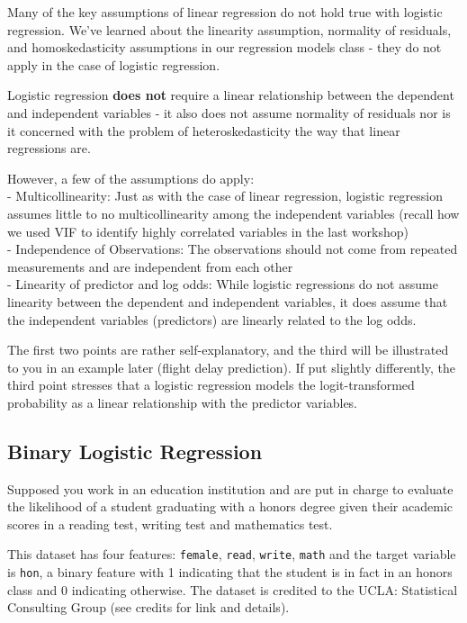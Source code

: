 \documentclass[
]{article}
\begin{document}
Many of the key assumptions of linear regression do not hold true with
logistic regression. We've learned about the linearity assumption,
normality of residuals, and homoskedasticity assumptions in our
regression models class - they do not apply in the case of logistic
regression.

Logistic regression \textbf{does not} require a linear relationship
between the dependent and independent variables - it also does not
assume normality of residuals nor is it concerned with the problem of
heteroskedasticity the way that linear regressions are.

However, a few of the assumptions do apply:\\
- Multicollinearity: Just as with the case of linear regression,
logistic regression assumes little to no multicollinearity among the
independent variables (recall how we used VIF to identify highly
correlated variables in the last workshop)\\
- Independence of Observations: The observations should not come from
repeated measurements and are independent from each other\\
- Linearity of predictor and log odds: While logistic regressions do not
assume linearity between the dependent and independent variables, it
does assume that the independent variables (predictors) are linearly
related to the log odds.

The first two points are rather self-explanatory, and the third will be
illustrated to you in an example later (flight delay prediction). If put
slightly differently, the third point stresses that a logistic
regression models the logit-transformed probability as a linear
relationship with the predictor variables.

\hypertarget{binary-logistic-regression}{%
\subsection{Binary Logistic
Regression}\label{binary-logistic-regression}}

Supposed you work in an education institution and are put in charge to
evaluate the likelihood of a student graduating with a honors degree
given their academic scores in a reading test, writing test and
mathematics test.

This dataset has four features: \texttt{female}, \texttt{read},
\texttt{write}, \texttt{math} and the target variable is \texttt{hon}, a
binary feature with 1 indicating that the student is in fact in an
honors class and 0 indicating otherwise. The dataset is credited to the
UCLA: Statistical Consulting Group (see credits for link and details).
\end{document}
